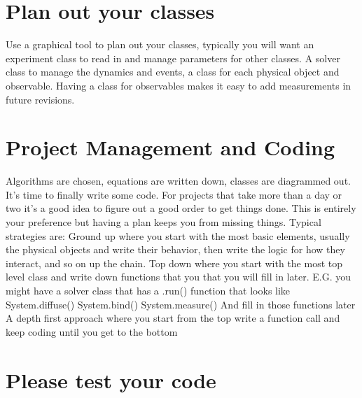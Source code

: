 \documentclass[]{scrartcl}
\begin{document}
\section{Plan out your classes}
Use a graphical tool to plan out your classes, typically you will want an experiment class to read in and manage parameters for other classes. A solver class to manage the dynamics and events, a class for each physical object and observable. Having a class for observables makes it easy to add measurements in future revisions. 

\section{Project Management and Coding}
Algorithms are chosen, equations are written down, classes are diagrammed out. It's time to finally write some code. For projects that take more than a day or two it's a good idea to figure out a good order to get things done. This is entirely your preference but having a plan keeps you from missing things. Typical strategies are:
Ground up where you start with the most basic elements, usually the physical objects and write their behavior, then write the logic for how they interact, and so on up the chain.
Top down where you start with the most top level class and write down functions that you that you will fill in later. E.G. you might have a solver class that has a .run() function that looks like
System.diffuse()
System.bind()
System.measure()
And fill in those functions later
A depth first approach where you start from the top write a function call and keep coding until you get to the bottom

\section{Please test your code}
\end{document}
